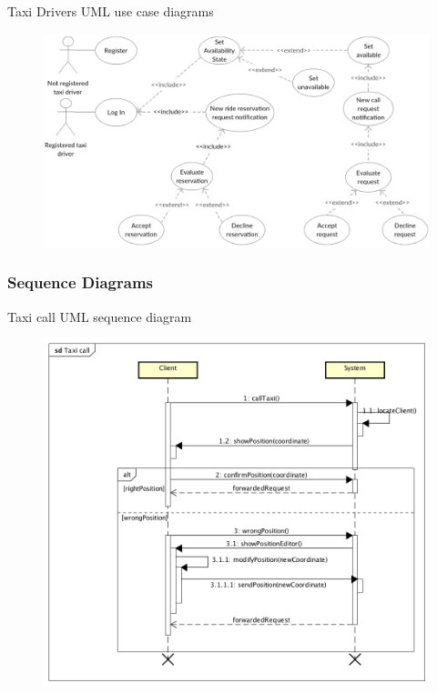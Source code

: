 \documentclass[9pt]{beamer}
\begin{document}
\begin{frame}{Taxi Drivers UML use case diagrams}
\begin{figure}[H]
\includegraphics[height=0.8\textheight]{UseCase-TaxiDriver}
\centering
\label{fig:usecasetaxidriver}
\end{figure}
\end{frame}

\subsubsection{Sequence Diagrams}
\begin{frame}{Taxi call UML sequence diagram}
\begin{figure}[H]
\includegraphics[height=0.8\textheight]{Sequence-Client-TaxiCall}
\centering
\label{fig:sequenceclienttaxicall}
\end{figure}
\end{frame}
\end{document}
